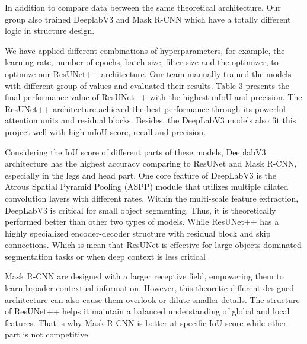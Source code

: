 \documentclass[conference]{IEEEtran}
\begin{document}
In addition to compare data between the same theoretical architecture. Our group also trained DeeplabV3 and Mask R-CNN which have a totally different logic in structure design.

We have applied different combinations of hyperparameters, for example, the learning rate, number of epochs, batch size, filter size and the optimizer, to optimize our ResUNet++ architecture. Our team manually trained the models with different group of values and evaluated their results. Table 3 presents the final performance value of ResUNet++ with the highest mIoU and precision. The ResUNet++ architecture achieved the best performance through its powerful attention units and residual blocks. Besides, the DeepLabV3 models also fit this project well with high mIoU score, recall and precision.

Considering the IoU score of different parts of these models, DeeplabV3 architecture has the highest accuracy comparing to ResUNet and Mask R-CNN, especially in the legs and head part. One core feature of DeepLabV3 is the Atrous Spatial Pyramid Pooling (ASPP) module that utilizes multiple dilated convolution layers with different rates. Within the multi-scale feature extraction, DeepLabV3 is critical for small object segmenting. Thus, it is theoretically performed better than other two types of models. While ResUNet++ has a highly specialized encoder-decoder structure with residual block and skip connections. Which is mean that ResUNet is effective for large objects dominated segmentation tasks or when deep context is less critical

Mask R-CNN are designed with a larger receptive field, empowering them to learn broader contextual information. However, this theoretic different designed architecture can also cause them overlook or dilute smaller details. The structure of ResUNet++ helps it maintain a balanced understanding of global and local features. That is why Mask R-CNN is better at specific IoU score while other part is not competitive 
\end{document}

